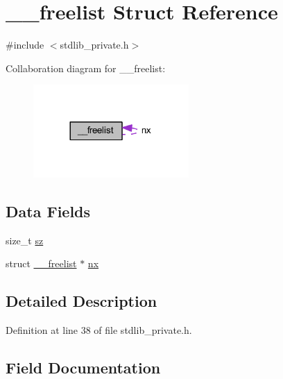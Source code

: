 \hypertarget{struct____freelist}{}\section{\+\_\+\+\_\+freelist Struct Reference}
\label{struct____freelist}


{\ttfamily \#include $<$stdlib\+\_\+private.\+h$>$}



Collaboration diagram for \+\_\+\+\_\+freelist\+:\nopagebreak
\begin{figure}[H]
\begin{center}
\leavevmode
\includegraphics[width=168pt]{struct____freelist__coll__graph}
\end{center}
\end{figure}
\subsection*{Data Fields}
\begin{DoxyCompactItemize}
\item 
size\+\_\+t \hyperlink{struct____freelist_aad50db3bff52eed270f16ef9e6acd8b1}{sz}
\item 
struct \hyperlink{struct____freelist}{\+\_\+\+\_\+freelist} $\ast$ \hyperlink{struct____freelist_ae718f53598ce7902b5c21759e2d0a2ec}{nx}
\end{DoxyCompactItemize}


\subsection{Detailed Description}


Definition at line 38 of file stdlib\+\_\+private.\+h.



\subsection{Field Documentation}
\hypertarget{struct____freelist_ae718f53598ce7902b5c21759e2d0a2ec}{}
